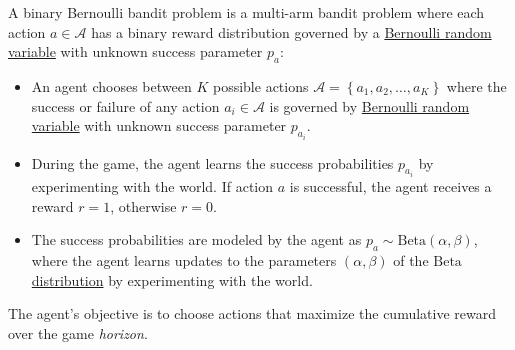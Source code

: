 \documentclass[11pt]{article}
\theoremstyle{definition}
\begin{document}
\begin{definition}\label{def:bernoulli-bandit-problem}
A binary Bernoulli bandit problem is a multi-arm bandit problem where each action $a\in\mathcal{A}$ has a binary reward distribution
governed by a \href{https://en.wikipedia.org/wiki/Bernoulli_distribution}{Bernoulli random variable} with unknown success parameter $p_{a}$:
\begin{itemize}
\item{An agent chooses between $K$ possible actions $\mathcal{A}=\left\{a_{1},a_{2},\dots,a_{K}\right\}$ where the success or failure of any action $a_{i}\in\mathcal{A}$
is governed by \href{https://en.wikipedia.org/wiki/Bernoulli_distribution}{Bernoulli random variable} with unknown success parameter $p_{a_{i}}$.}
\item{During the game, the agent learns the success probabilities $p_{a_{i}}$ by experimenting with the world. If action $a$ is successful, the agent receives a reward $r=1$, otherwise $r=0$.}
\item{The success probabilities are modeled by the agent as $p_{a}\sim\text{Beta}(\alpha,\beta)$, 
where the agent learns updates to the parameters $(\alpha,\beta)$ of the \href{https://en.wikipedia.org/wiki/Beta_distribution}{$\text{Beta}$ distribution}
by experimenting with the world.}
\end{itemize}
The agent's objective is to choose actions that maximize the cumulative reward over the game \textit{horizon}.
\end{definition}
\end{document}
